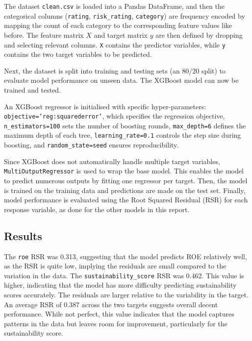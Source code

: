 The dataset \texttt{clean.csv} is loaded into a Pandas DataFrame, and then the categorical columns (\texttt{rating}, \texttt{risk\_rating}, \texttt{category}) are frequency encoded by mapping the count of each category to the corresponding feature values like before. The feature matrix \( X \) and target matrix \( y \) are then defined by dropping and selecting relevant columns. \texttt{X} contains the predictor variables, while \texttt{y} contains the two target variables to be predicted.

Next, the dataset is split into training and testing sets (an 80/20 split) to evaluate model performance on unseen data. The XGBoost model can now be trained and tested.

An XGBoost regressor is initialised with specific hyper-parameters: \newline \texttt{objective='reg:squarederror'}, which specifies the regression objective, \newline \texttt{n\_estimators=100} sets the number of boosting rounds, \texttt{max\_depth=6} defines the maximum depth of each tree, \texttt{learning\_rate=0.1} controls the step size during boosting, and \texttt{random\_state=seed} ensures reproducibility.

Since XGBoost does not automatically handle multiple target variables, \linebreak \texttt{MultiOutputRegressor} is used to wrap the base model. This enables the model to predict numerous outputs by fitting one regressor per target. Then, the model is trained on the training data and predictions are made on the test set. Finally, model performance is evaluated using the Root Squared Residual (RSR) for each response variable, as done for the other models in this report.

\subsection{Results}
The \texttt{roe} RSR  was 0.313, suggesting that the model predicts ROE relatively well, as the RSR is quite low, implying the residuals are small compared to the variation in the data. The \texttt{sustainability\_score} RSR was 0.462. This value is higher, indicating that the model has more difficulty predicting sustainability scores accurately. The residuals are larger relative to the variability in the target. An average RSR of 0.387 across the two targets suggests overall decent performance. While not perfect, this value indicates that the model captures patterns in the data but leaves room for improvement, particularly for the sustainability score.

